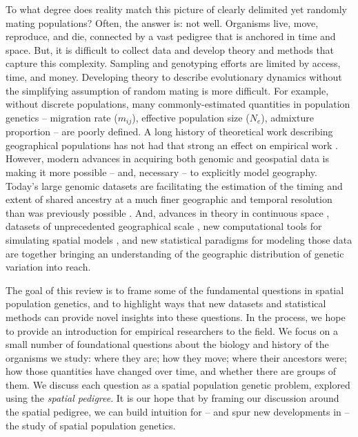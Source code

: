 \documentclass{ar-1col}
\renewcommand{\emph}[1]{{\textit{#1}}}
\begin{document}
To what degree does reality match this picture
of clearly delimited yet randomly mating populations?
Often, the answer is: not well.
Organisms live, move, reproduce, and die,
connected by a vast pedigree that is anchored in time and space.
But, it is difficult to collect data and develop theory and methods
that capture this complexity.
Sampling and genotyping efforts are limited by access, time, and money.
Developing theory to describe evolutionary dynamics
without the simplifying assumption of random mating
is more difficult.
For example, without discrete populations,
many commonly-estimated quantities in population genetics -- 
migration rate ($m_{ij}$), 
effective population size ($N_e$),
admixture proportion
--
are poorly defined.
A long history of theoretical work describing geographical populations
\citep[e.g.,][]{fisher1937wave,haldane1948theory,slatkin1973geneflow,nagylaki1975conditions,sawyer1976branching,barton1979dynamics}
has not had that strong an effect on empirical work \citep[but see][]{landscape_genomics_review}.
However, modern advances in acquiring both genomic and geospatial data
is making it more possible -- and, necessary -- to explicitly model geography.
Today's large genomic datasets
are facilitating the estimation of the timing and extent of shared ancestry 
at a much finer geographic and temporal resolution than was previously possible
\citep{Li_Durbin2011,Palamara_2012,Harris_Nielsen_2013,ralph2013geography}.
And, advances in theory in continuous space 
\citep{felsenstein1975pain,barton1995genealogies,barton-depaulis-etheridge, barton2010newmodel, hallatschek2011noisy, barton2010modelling, Barton2013},
datasets of unprecedented geographical scale
\citep[e.g.,][]{POBI, Aguillon2017deconstructing, Shaffer195743},
new computational tools for simulating spatial models \citep{haller2018forward,haller2019treesequence},
and new statistical paradigms for modeling those data 
\citep{petkova2016visualizing, ringbauer2017inferring, ringbauer2018estimating, conStruct, alasadi2018estimating}
are together bringing an understanding of the geographic distribution of genetic variation into reach.

The goal of this review
is to frame some of the fundamental questions in spatial population genetics,
and to highlight ways that new datasets and statistical methods 
can provide novel insights into these questions.
In the process, 
we hope to provide an introduction for empirical researchers
to the field.
We focus on a small number of foundational questions 
about the biology and history of the organisms we study:
where they are; how they move; where their ancestors were;
how those quantities have changed over time, 
and whether there are groups of them.
We discuss each question
as a spatial population genetic problem, 
explored using the \emph{spatial pedigree}.
It is our hope that by framing our discussion around the spatial pedigree, 
we can build intuition for --
and spur new developments in --
the study of spatial population genetics.
\end{document}
